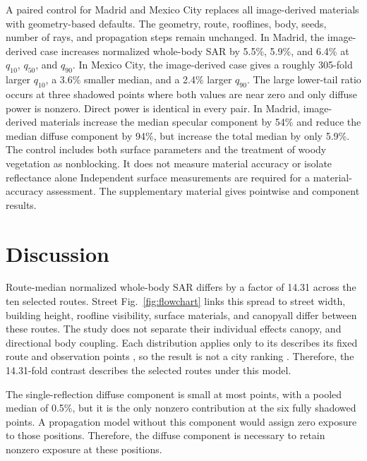\documentclass{IEEEoj}
\providecommand{\DIFadd}[1]{{\protect\color{blue} \sf #1}} %
\providecommand{\DIFdel}[1]{{\protect\color{red} \scriptsize #1}} %
\providecommand{\DIFaddbegin}{} %
\providecommand{\DIFaddend}{} %
\providecommand{\DIFdelbegin}{} %
\providecommand{\DIFdelend}{} %
\begin{document}
A paired control for Madrid and Mexico City replaces all image-derived
materials with geometry-based defaults. The geometry, route, rooflines, body,
seeds, number of rays, and propagation steps remain unchanged. In Madrid, the
image-derived case increases normalized whole-body SAR by 5.5\%, 5.9\%, and
6.4\% at $q_{10}$, $q_{50}$, and $q_{90}$. In Mexico City, the image-derived case gives a roughly
305-fold larger $q_{10}$, a 3.6\% smaller median, and a 2.4\% larger $q_{90}$.
The large lower-tail ratio occurs at three shadowed points where both values are
near zero and only diffuse power is nonzero. Direct power is identical in every
pair. In Madrid, image-derived materials increase the median specular component
by 54\% and reduce the median diffuse component by 94\%, but increase the total
median by only 5.9\%. The control includes both surface parameters and the
treatment of woody vegetation as nonblocking. \DIFdelbegin \DIFdel{It does not measure material
accuracy or isolate reflectance alone}\DIFdelend \DIFaddbegin \DIFadd{Independent surface measurements
are required for a material-accuracy assessment}\DIFaddend . The supplementary material gives
pointwise and component results.

\section{Discussion}
\label{sec:discussion}

Route-median normalized whole-body SAR differs by a factor of 14.31 across the
ten selected routes. \DIFdelbegin \DIFdel{Street }\DIFdelend \DIFaddbegin \DIFadd{Fig.~\ref{fig:flowchart} links this spread to street }\DIFaddend width,
building height, roofline visibility, surface materials, \DIFdelbegin \DIFdel{and canopyall differ between these routes. The study does
not separate their individual effects}\DIFdelend \DIFaddbegin \DIFadd{canopy, and
directional body coupling}\DIFaddend . Each
distribution \DIFdelbegin \DIFdel{applies only to its }\DIFdelend \DIFaddbegin \DIFadd{describes its fixed }\DIFaddend route and observation points\DIFdelbegin \DIFdel{, so the
result is not a city ranking}\DIFdelend \DIFaddbegin \DIFadd{. Therefore, the
14.31-fold contrast describes the selected routes under this model}\DIFaddend .

The single-reflection diffuse component is small at most points, with a pooled
median of 0.5\%, but it is the only nonzero contribution at the six fully
shadowed points. A propagation model without this component would assign zero
exposure to those positions. Therefore, the diffuse component is necessary to
retain nonzero exposure at these positions.
\end{document}
